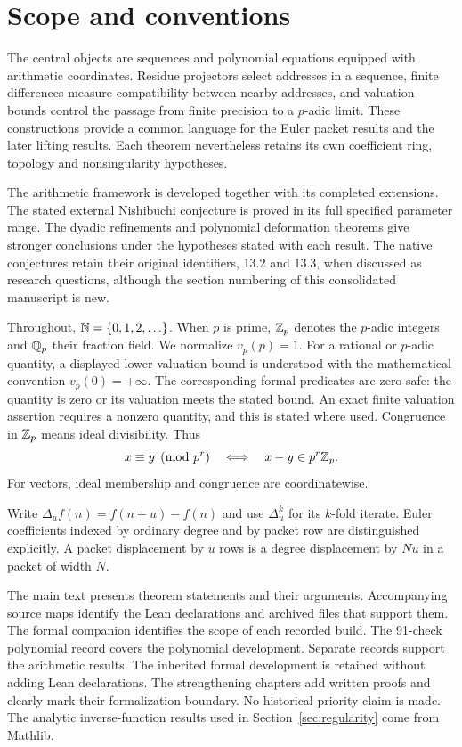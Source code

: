 \section{Scope and conventions}
\label{sec:scope}
The central objects are sequences and polynomial equations equipped with
arithmetic coordinates. Residue projectors select addresses in a sequence,
finite differences measure compatibility between nearby addresses, and
valuation bounds control the passage from finite precision to a $p$-adic
limit. These constructions provide a common language for the Euler packet
results and the later lifting results. Each theorem nevertheless retains its
own coefficient ring, topology and nonsingularity hypotheses.

The arithmetic framework is developed together with its completed
extensions. The stated external Nishibuchi conjecture is proved in its full
specified parameter range. The dyadic refinements and polynomial deformation theorems give stronger
conclusions under the hypotheses stated with each result. The native conjectures retain their original
identifiers, 13.2 and 13.3, when discussed as research questions, although the
section numbering of this consolidated manuscript is new.

Throughout, $\mathbb N=\{0,1,2,\ldots\}$. When $p$ is prime, $\mathbb Z_p$ denotes the
$p$-adic integers and $\mathbb Q_p$ their fraction field. We normalize $v_p(p)=1$.
For a rational or $p$-adic quantity, a displayed lower valuation bound is
understood with the mathematical convention $v_p(0)=+\infty$.
The corresponding formal predicates are zero-safe: the quantity is zero or
its valuation meets the stated bound. An exact finite valuation assertion
requires a nonzero quantity, and this is stated where used. Congruence in
$\mathbb Z_p$ means ideal divisibility. Thus
\[
 x\equiv y\pmod{p^r}\quad\Longleftrightarrow\quad
 x-y\in p^r\mathbb Z_p.
\]
For vectors, ideal membership and congruence are coordinatewise.

Write $\Delta_u f(n)=f(n+u)-f(n)$ and use $\Delta_u^k$ for its $k$-fold
iterate. Euler coefficients indexed by ordinary degree and by packet row are
distinguished explicitly. A packet displacement by $u$ rows is a degree
displacement by $Nu$ in a packet of width $N$.

The main text presents theorem statements and their arguments. Accompanying
source maps identify the Lean declarations and archived files that support
them. The formal companion identifies the scope of each recorded build. The
91-check polynomial record covers the polynomial development. Separate
records support the arithmetic results.
The inherited formal development is retained without adding Lean declarations. The strengthening chapters add written proofs and clearly mark their formalization boundary. No historical-priority claim is made. The analytic inverse-function results
used in Section~\ref{sec:regularity} come from Mathlib.

